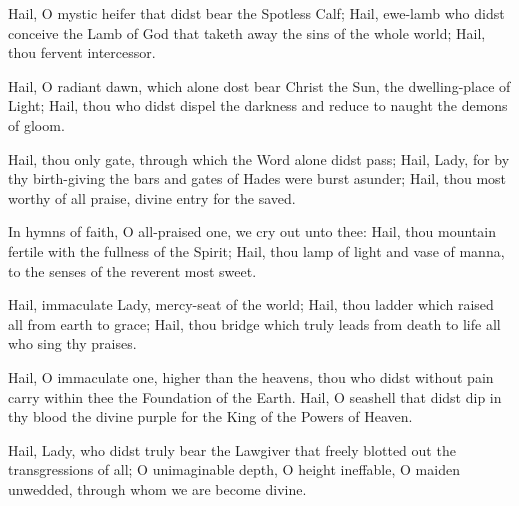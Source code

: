 \documentclass[twoside, letterpaper, 12pt]{report}
\begin{document}

Hail, O mystic heifer that didst bear the Spotless Calf;
Hail, ewe-lamb who didst conceive the Lamb of God that taketh away the sins
of the whole world; Hail, thou fervent intercessor.


Hail, O radiant dawn, which alone dost bear Christ the Sun, the dwelling-place of Light;
Hail, thou who didst dispel the darkness and reduce to naught the demons of gloom.


Hail, thou only gate, through which the Word alone didst pass;
Hail, Lady, for by thy birth-giving the bars and gates of Hades were burst asunder;
Hail, thou most worthy of all praise, divine entry for the saved.





In hymns of faith, O all-praised one, we cry out unto thee:
Hail, thou mountain fertile with the fullness of the Spirit;
Hail, thou lamp of light and vase of manna, to the senses of the reverent most sweet.


Hail, immaculate Lady, mercy-seat of the world;
Hail, thou ladder which raised all from earth to grace;
Hail, thou bridge which truly leads from death to life all who sing thy praises.


Hail, O immaculate one, higher than the heavens,
thou who didst without pain carry within thee the Foundation of the Earth.
Hail, O seashell that didst dip in thy blood the divine purple
for the King of the Powers of Heaven.


Hail, Lady, who didst truly bear the Lawgiver
that freely blotted out the transgressions of all;
O unimaginable depth, O height ineffable, O maiden unwedded,
through whom we are become divine.
\end{document}
